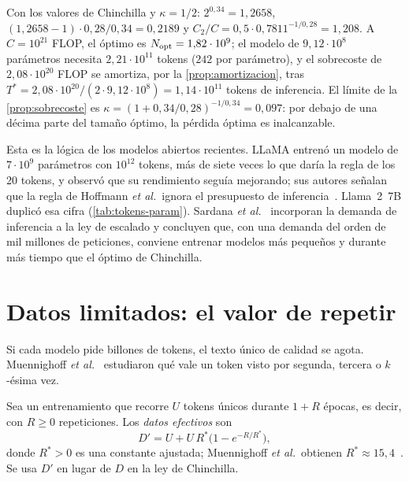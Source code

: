 \begin{ejemplo}\label{ej:sobreentreno}
Con los valores de Chinchilla y $\kappa=1/2$: $2^{0{,}34}=1{,}2658$, $(1{,}2658-1)\cdot 0{,}28/0{,}34=0{,}2189$ y $C_2/C=0{,}5\cdot 0{,}7811^{-1/0{,}28}=1{,}208$. A $C=10^{21}$ FLOP, el óptimo es $N_{\mathrm{opt}}=1{,}82\cdot 10^{9}$; el modelo de $9{,}12\cdot 10^{8}$ parámetros necesita $2{,}21\cdot 10^{11}$ tokens ($242$ por parámetro), y el sobrecoste de $2{,}08\cdot 10^{20}$ FLOP se amortiza, por la \cref{prop:amortizacion}, tras $T^{*}=2{,}08\cdot 10^{20}/(2\cdot 9{,}12\cdot 10^{8})=1{,}14\cdot 10^{11}$ tokens de inferencia. El límite de la \cref{prop:sobrecoste} es $\kappa=(1+0{,}34/0{,}28)^{-1/0{,}34}=0{,}097$: por debajo de una décima parte del tamaño óptimo, la pérdida óptima es inalcanzable.
\end{ejemplo}

Esta es la lógica de los modelos abiertos recientes. LLaMA entrenó un modelo de $7\cdot 10^{9}$ parámetros con $10^{12}$ tokens, más de siete veces lo que daría la regla de los 20 tokens, y observó que su rendimiento seguía mejorando; sus autores señalan que la regla de Hoffmann \emph{et al.}\ ignora el presupuesto de inferencia~\cite[§1]{llama}. Llama~2~7B duplicó esa cifra (\cref{tab:tokens-param}). Sardana \emph{et al.}~\cite{sardana} incorporan la demanda de inferencia a la ley de escalado y concluyen que, con una demanda del orden de mil millones de peticiones, conviene entrenar modelos más pequeños y durante más tiempo que el óptimo de Chinchilla.

\section{Datos limitados: el valor de repetir}

Si cada modelo pide billones de tokens, el texto único de calidad se agota. Muennighoff \emph{et al.}~\cite{muennighoff} estudiaron qué vale un token visto por segunda, tercera o $k$-ésima vez.

\begin{definicion}\label{def:efectivos}
Sea un entrenamiento que recorre $U$ tokens únicos durante $1+R$ épocas, es decir, con $R\ge 0$ repeticiones. Los \emph{datos efectivos} son~\cite[§3.1, ecuación~(5)]{muennighoff}
\[
D'=U+U\,R^{*}\bigl(1-e^{-R/R^{*}}\bigr),
\]
donde $R^{*}>0$ es una constante ajustada; Muennighoff \emph{et al.}\ obtienen $R^{*}\approx 15{,}4$~\cite[apéndice~A]{muennighoff}. Se usa $D'$ en lugar de $D$ en la ley de Chinchilla.
\end{definicion}

